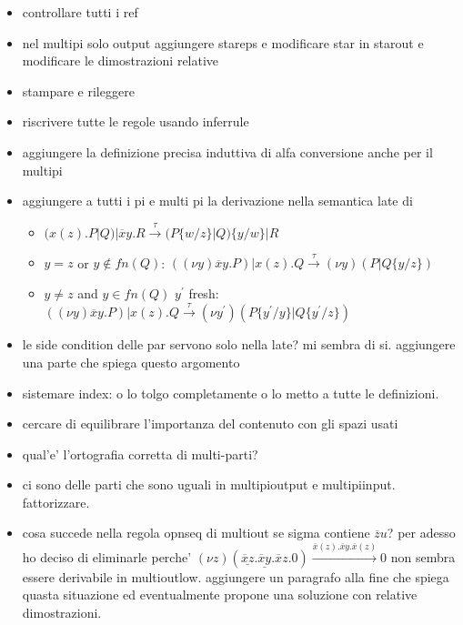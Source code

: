 \begin{itemize}
  \item 
    controllare tutti i ref
  \item 
    nel multipi solo output aggiungere stareps e modificare star in starout e modificare le dimostrazioni relative 
  \item 	
    stampare e rileggere
  \item
    riscrivere tutte le regole usando inferrule
  \item
    aggiungere la definizione precisa induttiva di alfa conversione anche per il multipi
  \item
    aggiungere a tutti i pi e multi pi la derivazione nella semantica late di
    \begin{itemize}
      \item 
	$(x(z).P|Q)|\overline{x}y.R \xrightarrow{\tau} (P\{w/z\}|Q)\{y/w\}|R$ 
      \item
	$y=z$ or $y\notin fn(Q)$: $((\nu y) \overline{x}y.P)| x(z).Q \xrightarrow{\tau} (\nu y)(P|Q\{y/z\})$
      \item
	$y\neq z$ and $y\in fn(Q)$  $y^{'}$ fresh: $((\nu y) \overline{x}y.P)| x(z).Q \xrightarrow{\tau} (\nu y^{'})(P\{y^{'}/y\}|Q\{y^{'}/z\})$
    \end{itemize}
  \item	
    le side condition delle par servono solo nella late? mi sembra di si. aggiungere una parte che spiega questo argomento
  \item
    sistemare index: o lo tolgo completamente o lo metto a tutte le definizioni.
  \item	
    cercare di equilibrare l'importanza del contenuto con gli spazi usati
  \item	
    qual'e' l'ortografia corretta di multi-parti?
  \item	
    ci sono delle parti che sono uguali in multipioutput e multipiinput. fattorizzare.
  \item	
    cosa succede nella regola opnseq di multiout se sigma contiene $\overline{z}u$? per adesso ho deciso di eliminarle perche' $(\nu z)(\underline{\overline{x}z}.\underline{\overline{x}y}.\overline{x}z.0) \xrightarrow{\overline{x}(z).\overline{x}y.\overline{x}(z)} 0$ non sembra essere derivabile in multioutlow. aggiungere un paragrafo alla fine che spiega quasta situazione ed eventualmente propone una soluzione con relative dimostrazioni.
\end{itemize}
